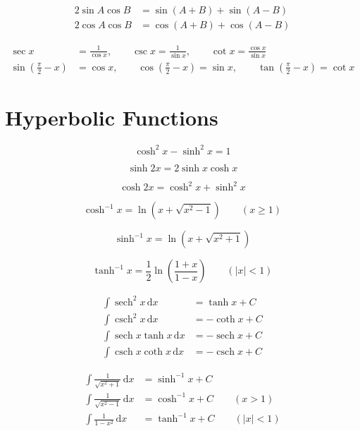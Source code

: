 \documentclass[12pt]{article}
\begin{document}
	\[
	\begin{aligned}
		2\sin A\cos B&=\sin(A+B)+\sin(A-B) \\[0.5ex]
		2\cos A\cos B&=\cos(A+B)+\cos(A-B)
	\end{aligned}
	\]

	\[
	\begin{aligned}
		\sec x&=\frac{1}{\cos x}, \qquad \csc x=\frac{1}{\sin x}, \qquad \cot x=\frac{\cos x}{\sin x} \\[0.5ex]
		\sin\left(\frac{\pi}{2}-x\right)&=\cos x, \qquad \cos\left(\frac{\pi}{2}-x\right)=\sin x, \qquad \tan\left(\frac{\pi}{2}-x\right)=\cot x
	\end{aligned}
	\]

	\newpage

	\section*{Hyperbolic Functions}

	\[
	\cosh^2 x-\sinh^2 x=1
	\]

	\[
	\sinh 2x=2\sinh x\cosh x
	\]

	\[
	\cosh 2x=\cosh^2 x+\sinh^2 x
	\]

	\[
	\cosh^{-1}x=\ln\!\left(x+\sqrt{x^2-1}\right)\qquad (x\ge 1)
	\]

	\[
	\sinh^{-1}x=\ln\!\left(x+\sqrt{x^2+1}\right)
	\]

	\[
	\tanh^{-1}x=\frac{1}{2}\ln\!\left(\frac{1+x}{1-x}\right)\qquad (|x|<1)
	\]

	\[
	\begin{aligned}
		\int \operatorname{sech}^2 x\,\mathrm{d}x&=\tanh x+C \\[0.5ex]
		\int \operatorname{csch}^2 x\,\mathrm{d}x&=-\coth x+C \\[0.5ex]
		\int \operatorname{sech} x\tanh x\,\mathrm{d}x&=-\operatorname{sech} x+C \\[0.5ex]
		\int \operatorname{csch} x\coth x\,\mathrm{d}x&=-\operatorname{csch} x+C
	\end{aligned}
	\]

	\[
	\begin{aligned}
		\int \frac{1}{\sqrt{x^2+1}}\,\mathrm{d}x&=\sinh^{-1}x+C \\[0.5ex]
		\int \frac{1}{\sqrt{x^2-1}}\,\mathrm{d}x&=\cosh^{-1}x+C \qquad (x>1) \\[0.5ex]
		\int \frac{1}{1-x^2}\,\mathrm{d}x&=\tanh^{-1}x+C \qquad (|x|<1)
	\end{aligned}
	\]

	\newpage
\end{document}
